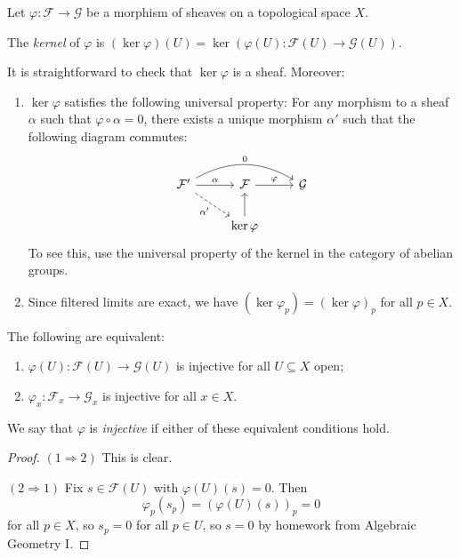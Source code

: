 \begin{remark}
  Let $\varphi : \mathcal{F} \to \mathcal{G}$
  be a morphism of sheaves on
  a topological space $X$.
\end{remark}

\begin{definition}
  The \emph{kernel} of $\varphi$
  is $(\ker \varphi)(U) = \ker(\varphi(U) : \mathcal{F}(U) \to \mathcal{G}(U))$.
\end{definition}

\begin{remark}
  It is straightforward to check that
  $\ker \varphi$ is a sheaf. Moreover:
  \begin{enumerate}
    \item $\ker \varphi$
      satisfies the following
      universal property: For any
      morphism to a sheaf $\alpha$
      such that $\varphi \circ \alpha = 0$,
      there exists a unique morphism
      $\alpha'$
      such that the following diagram commutes:
      \[
        \begin{tikzcd}
          \mathcal{F}' \ar[r, "\alpha"] \ar[rr, bend left=30, "0"] \ar[dr, "\alpha'", dashed, swap]& \mathcal{F} \ar[r, "\varphi"] & \mathcal{G} \\
                                                & \ker \varphi \ar[u]
        \end{tikzcd}
      \]
      To see this, use the universal
      property of the kernel in the
      category of abelian groups.
    \item Since filtered limits are
      exact, we have
      $(\ker \varphi_p) = (\ker \varphi)_p$
      for all $p \in X$.
  \end{enumerate}
\end{remark}

\begin{lemma}
  The following are equivalent:
  \begin{enumerate}
    \item $\varphi(U) : \mathcal{F}(U) \to \mathcal{G}(U)$
      is injective for all
      $U \subseteq X$ open;
    \item $\varphi_x : \mathcal{F}_x \to \mathcal{G}_x$
      is injective for all $x \in X$.
  \end{enumerate}
  We say that $\varphi$ is
  \emph{injective} if either of these
  equivalent conditions hold.
\end{lemma}

\begin{proof}
  $(1 \Rightarrow 2)$ This is clear.

  $(2 \Rightarrow 1)$ Fix $s \in \mathcal{F}(U)$
  with $\varphi(U)(s) = 0$. Then
  \[
    \varphi_p(s_p)
    = (\varphi(U)(s))_p
    = 0
  \]
  for all $p \in X$, so
  $s_p = 0$ for all $p \in U$, so
  $s = 0$ by homework from Algebraic
  Geometry I.
\end{proof}


